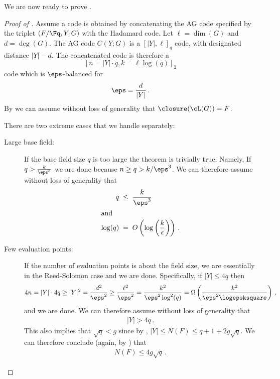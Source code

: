 We are now ready to prove .
\begin{proof}[Proof of ]
Assume a code is obtained by concatenating the AG code specified by
the triplet $(F/\Fq,Y,G)$ with the Hadamard code. Let $\ell =
\dim(G)$ and $d = \deg(G)$. The AG code $C(Y;G)$ is a $[|Y|,\ell]_q$
code, with designated distance $|Y|-d$. The concatenated code is
therefore a $$[n=|Y| \cdot q, k=\ell \log(q)]_2$$ code which is
$\eps$-balanced for
$$\eps=\frac{d}{|Y|}\,.$$
By  we can assume without loss of
generality that $\closure(\cL(G))=F$.


There are two extreme cases that we handle separately:

\begin{description}
\item [Large base field:]
If the base field size $q$ is too large the theorem is trivially
true. Namely, If $q>\frac{k}{\eps^3}$ we are done because
$n \ge q > {k}/{\eps^3}$. We can therefore assume without loss
of generality that
\begin{align}
\nonumber q \;& \le \; \frac{k}{\eps^3}\\
\intertext{and}
\label{eq:qlogeps}\log(q)\; & = \;O\left(\log\left(\frac{k}{\epsilon}\right)\right)\,.
\end{align}

\item [Few evaluation points:]
If the number of evaluation points is about the field size, we are
essentially in the Reed-Solomon case and we are done. Specifically,
if $|Y| \le 4q$ then $$4n= |Y| \cdot 4q \ge |Y|^2 =
\frac{d^2}{\eps^2} \ge \frac{ \ell^2 }{\eps^2} = \frac{ k^2 }{\eps^2
\log^2(q)} = \Omega\left(\frac{k^2}{\eps^2 \logepsksquare}\right)\,,$$
and we are done. We can therefore assume without loss of generality
that
\begin{eqnarray*}
|Y| > 4q\,.
\end{eqnarray*}
This also implies that $\sqrt{q} < g$ since by
, $|Y|  \le  N(F) \le  q+1 +2g
\sqrt{q}$. We can therefore conclude (again, by
) that
\begin{eqnarray}\label{eq:N}
N(F) \le 4g\sqrt{q}\,.
\end{eqnarray}
\end{description}







\end{proof}
